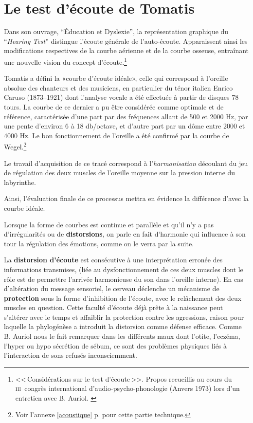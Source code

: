 
\section{Le test d'écoute de Tomatis}


Dans son ouvrage, ``Éducation et
    Dyslexie'',\autocite{tomatis:education} la représentation graphique du 
 ``\emph{Hearing Test}'' distingue l'écoute générale de l'auto-écoute.
 Apparaissent ainsi les modifications respectives
 de la courbe aérienne et de la courbe osseuse, entraînant une nouvelle vision
 du concept d'écoute.\footnote{<<\,Considérations sur le test d'écoute\,>>. Propos
  	recueillis au cours du \textsc{iii}\ieme\ congrès international
  	d'audio-psycho-phonologie (Anvers 1973) lors d'un entretien
        avec B. Auriol. \autocite{auriol_stress}}





Tomatis a défini la «courbe d'écoute idéale», celle qui correspond à l'oreille absolue
des chanteurs et des musiciens, en particulier du ténor italien Enrico
Caruso (1873--1921) dont l'analyse vocale a été effectuée à partir de
disques 78 tours. La courbe de ce dernier a pu être considérée comme
optimale et de référence, caractérisée d'une part par des fréquences allant de 500 et 2000
Hz, par une pente d\textquoteright environ 6 à 18 db/octave,
et d'autre part par un dôme entre 2000 et 4000 Hz.
Le bon fonctionnement de l'oreille a été confirmé par la courbe
de Wegel.\footnote{
		Voir l'annexe \ref{acoustique} p. \pageref{acoustique}
		 pour cette partie technique.}
               

Le travail d'acquisition de ce tracé correspond à l'\textsl{harmonisation}
découlant du jeu de régulation des deux muscles de l'oreille moyenne
sur la pression interne du
labyrinthe.

Ainsi, l'évaluation finale de ce processus mettra en évidence la différence
d'avec la courbe idéale.

Lorsque la forme de
courbes est continue et parallèle et qu'il n'y a pas d'irrégularités ou
de \textbf{distorsions},
on parle en fait d'harmonie qui influence à son tour 
la régulation des émotions, comme on le verra par la suite.




La \textbf{distorsion d'écoute} est consécutive à une interprétation
erronée des informations transmises, (liée au dysfonctionnement
de ces deux muscles dont le rôle est de permettre l'arrivée
harmonieuse du son dans l'oreille interne). En cas d'altération du message sensoriel,
le cerveau déclenche un mécanisme de\textbf{ protection} sous la forme
d'inhibition de l'écoute, avec le relâchement des deux muscles en question.
Cette faculté d'écoute déjà prête à la naissance peut s'altérer avec
le temps et affaiblir la protection contre les agressions, raison pour
laquelle la phylogénèse a introduit la distorsion comme défense
efficace. Comme B. Auriol nous le fait remarquer dans 
les différents maux dont l'otite, l'eczéma, l'hyper
ou hypo sécrétion de sébum, ce sont des problèmes physiques liés à l'interaction de sons refusés
inconsciemment.  \autocite  [19--20] {auriol:cle}

